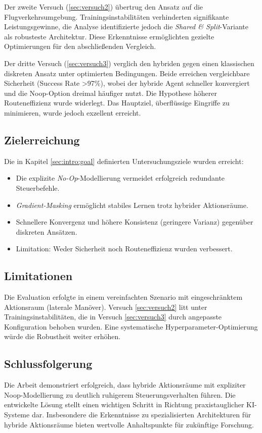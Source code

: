 Der zweite Versuch (\ref{sec:versuch2}) übertrug den Ansatz auf die Flugverkehrsumgebung. Trainingsinstabilitäten verhinderten signifikante Leistungsgewinne, die Analyse identifizierte jedoch die \emph{Shared \& Split}-Variante als robusteste Architektur. Diese Erkenntnisse ermöglichten gezielte Optimierungen für den abschließenden Vergleich.
\medskip

Der dritte Versuch (\ref{sec:versuch3}) verglich den hybriden gegen einen klassischen diskreten Ansatz unter optimierten Bedingungen. Beide erreichen vergleichbare Sicherheit (Success Rate >97\%), wobei der hybride Agent schneller konvergiert und die Noop-Option dreimal häufiger nutzt. Die Hypothese höherer Routeneffizienz wurde widerlegt. Das Hauptziel, überflüssige Eingriffe zu minimieren, wurde jedoch exzellent erreicht.

\subsection*{Zielerreichung}
Die in Kapitel \ref{sec:intro:goal} definierten Untersuchungsziele wurden erreicht:
\begin{itemize}
    \item Die explizite \emph{No-Op}-Modellierung vermeidet erfolgreich redundante Steuerbefehle.
    \item \emph{Gradient\hyp{}Masking} ermöglicht stabiles Lernen trotz hybrider Aktionsräume.
    \item Schnellere Konvergenz und höhere Konsistenz (geringere Varianz) gegenüber diskreten Ansätzen.
    \item Limitation: Weder Sicherheit noch Routeneffizienz wurden verbessert.
\end{itemize}

\subsection*{Limitationen}
Die Evaluation erfolgte in einem vereinfachten Szenario mit eingeschränktem Aktionsraum (laterale Manöver). Versuch \ref{sec:versuch2} litt unter Trainingsinstabilitäten, die in Versuch \ref{sec:versuch3} durch angepasste Konfiguration behoben wurden. Eine systematische Hyperparameter-Optimierung würde die Robustheit weiter erhöhen.


\subsection*{Schlussfolgerung}
Die Arbeit demonstriert erfolgreich, dass hybride Aktionsräume mit expliziter Noop-Modellierung zu deutlich ruhigerem Steuerungsverhalten führen. Die entwickelte Lösung stellt einen wichtigen Schritt in Richtung praxistauglicher \ac{KI}-Systeme dar. Insbesondere die Erkenntnisse zu spezialisierten Architekturen für hybride Aktionsräume bieten wertvolle Anhaltspunkte für zukünftige Forschung.

